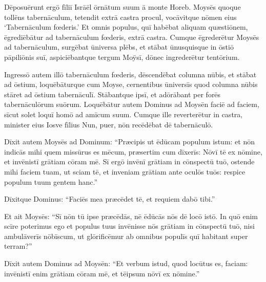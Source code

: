 Dēposuērunt ergō
fīliī Isrāēl ōrnātum suum ā monte Horeb. 
Moysēs quoque tollēns tabernāculum,
tetendit extrā castra procul, vocāvitque nōmen eius `Tabernāculum fœderis.'
Et omnis populus, quī habēbat aliquam quæstiōnem, ēgrediēbātur ad
tabernāculum fœderis, extrā castra. 
Cumque ēgrederētur Moysēs ad
tabernāculum, surgēbat ūniversa plēbs, et stābat ūnusquisque in ōstiō pāpiliōnis
suī, aspiciēbantque tergum Moȳsī, dōnec ingrederētur tentōrium. 

Ingressō autem illō
tabernāculum fœderis, dēscendēbat columna nūbis, et stābat ad ōstium,
loquēbāturque cum Moyse, 
cernentibus ūniversīs quod
columna nūbis stāret ad ōstium tabernāculī. Stābantque
ipsī, et adōrābant per forēs tabernāculōrum suōrum. 
Loquēbātur autem Dominus ad Moysēn faciē ad faciem, sīcut solet loquī homō
ad amīcum suum. Cumque ille reverterētur in castra, minister eius Iosve
fīlius Nun, puer, nōn recēdēbat dē
tabernāculō. 

Dīxit autem Moysēs ad Dominum:
``Præcipis ut ēdūcam populum istum: et nōn
indicās mihi quem missūrus es mēcum,
præsertim cum dīxerīs: Nōvī tē ex nōmine, et
invēnistī grātiam cōram mē. 
Sī ergō invēnī grātiam in cōnspectū tuō,
ostende mihi faciem tuam, ut sciam tē, et inveniam grātiam ante oculōs tuōs:
respice populum tuum gentem hanc.''

Dīxitque Dominus: ``Faciēs mea præcēdet tē, et
requiem dabō tibi.''

Et ait
Moysēs: ``Sī nōn tū ipse præcēdās, nē ēdūcās nōs dē locō istō. 
In quō
enim scīre poterimus ego et populus tuus invēnisse nōs grātiam in cōnspectū
tuō, nisi ambulāverīs nōbīscum, ut glōrificēmur ab omnibus populīs quī habitant super terram?''

Dīxit
autem Dominus ad Moysēn: ``Et verbum istud, quod locūtus es, faciam:
invēnistī enim grātiam cōram mē, et tēipsum nōvī ex nōmine.''


